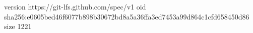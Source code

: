 version https://git-lfs.github.com/spec/v1
oid sha256:e0605bed46f6077b898b30672bd8a5a36ffa3ed7453a99d864c1cfd658450d86
size 1221
